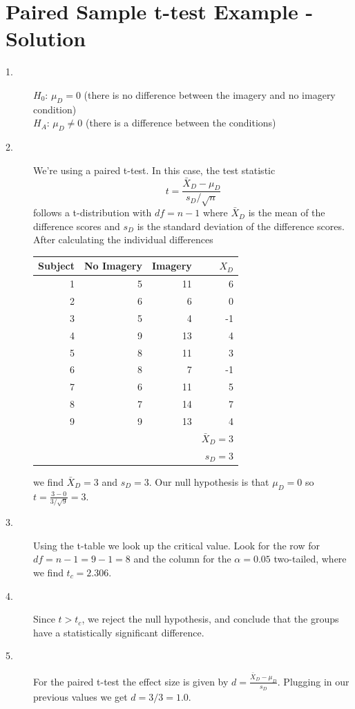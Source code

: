 \documentclass{tufte-handout}
\begin{document}
\section{Paired Sample t-test Example - Solution}
\begin{fullwidth}
\begin{description}
\item[1.] $H_0$: $\mu_D=0$ (there is no difference between the imagery and no imagery condition)\\
$H_A$: $\mu_D\neq0$ (there is a difference between the conditions)

\item[2.] We're using a paired t-test. In this case, the test statistic
\begin{equation*}
t=\frac{\bar{X}_D-\mu_D}{s_D/\sqrt{n}}
\end{equation*}
follows a t-distribution with $df=n-1$ where $\bar{X}_D$ is the mean of the difference scores and $s_D$ is the standard deviation of the difference scores. After calculating the individual differences

\begin{table}
  \centering
  \selectfont
  \begin{tabular}{rrrr}
    \toprule
Subject&	No Imagery&	Imagery&	$X_D$\\
    \midrule
1&	5&	11&	6\\
2&	6&	6&	0\\
3&	5&	4&	-1\\
4&	9&	13&	4\\
5&	8&	11&	3\\
6&	8&	7&	-1\\
7&	6&	11&	5\\
8&	7&	14&	7\\
9&	9&	13&	4\\
    \bottomrule
&&&$\bar{X}_D=3$\\
&&&$s_D=3$\\
    \bottomrule
  \end{tabular}
  \label{tab:normaltab}
\end{table}
\vspace{20pt}
we find  $\bar{X}_D=3$ and  $s_D=3$. Our null hypothesis is that $\mu_D=0$ so $t=\frac{3-0}{3/\sqrt{9}}=3$.

\item[3.] Using the t-table we look up the critical value. Look for the row for $df=n-1=9-1=8$ and the column for the $\alpha=0.05$ two-tailed, where we find $t_c=2.306$.
\item[4.] Since $t>t_c$, we reject the null hypothesis, and conclude that the groups have a statistically significant difference.
\item[5.]For the paired t-test the effect size is given by $d=\frac{\bar{X}_D-\mu_D}{s_D}$. Plugging in our previous values we get $d=3/3 = 1.0$.
\end{description}
\end{fullwidth}
\end{document}
